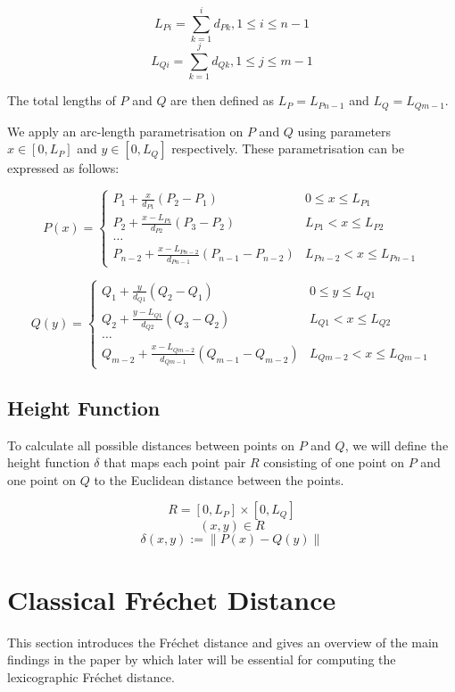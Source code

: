 $$L_{Pi} = \sum\limits_{k=1}^{i} {d_{Pk}}, 1 \leq i \leq n-1$$
$$L_{Qi} = \sum\limits_{k=1}^{j} {d_{Qk}}, 1 \leq j \leq m-1$$

The total lengths of $P$ and $Q$ are then defined as $L_P = L_{Pn-1}$ and $L_Q = L_{Qm-1}$.

We apply an arc-length parametrisation on $P$ and $Q$ using parameters $x \in [0, L_P]$ and $y \in [0, L_Q]$ respectively. These parametrisation can be expressed as follows:

\[ P(x) =
\begin{cases} 
	P_1 + \frac{x}{d_{P1}}(P_2-P_1) & 0 \leq x \leq L_{P1} \\
	P_2 + \frac{x-L_{P1}}{d_{P2}}(P_3-P_2) & L_{P1} < x \leq L_{P2} \\
	\dots \\
	P_{n-2} + \frac{x-L_{Pn-2}}{d_{Pn-1}}(P_{n-1}-P_{n-2}) & L_{Pn-2} < x \leq L_{Pn-1}
\end{cases}
\]

\[ Q(y) =
\begin{cases} 
	Q_1 + \frac{y}{d_{Q1}}(Q_2-Q_1) & 0 \leq y \leq L_{Q1} \\
	Q_2 + \frac{y-L_{Q1}}{d_{Q2}}(Q_3-Q_2) & L_{Q1} < x \leq L_{Q2} \\
	\dots \\
	Q_{m-2} + \frac{x-L_{Qm-2}}{d_{Qm-1}}(Q_{m-1}-Q_{m-2}) & L_{Qm-2} < x \leq L_{Qm-1}
\end{cases}
\]

\subsection{Height Function} \label{heightfunc}

To calculate all possible distances between points on $P$ and $Q$, we will define the height function $\delta$ that maps each point pair $R$ consisting of one point on $P$ and one point on $Q$ to the Euclidean distance between the points.

$$R = [0, L_P ] \times [0, L_Q]$$
$$(x, y) \in R$$
$$\delta(x, y) := \left\| P(x) - Q(y) \right\|$$

\section{Classical Fréchet Distance}

This section introduces the Fréchet distance and gives an overview of the main  findings in the \citeyear{altgodau} paper  by \citeauthor*{altgodau}\cite{altgodau} which later will be essential for computing the lexicographic Fréchet distance.


